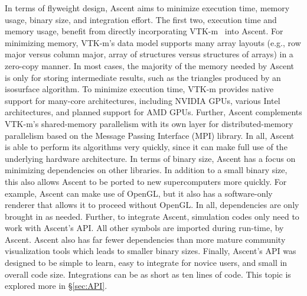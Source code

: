 In terms of flyweight design, Ascent aims to minimize
execution time, memory usage, binary size, and integration effort.
%
The first two, execution time and memory usage, benefit from directly
incorporating VTK-m~\cite{Moreland:CGA2016} into Ascent.
%
For minimizing memory,
VTK-m's data model supports many array layouts (e.g., row major versus
column major, array of structures versus structures of arrays)
in a zero-copy manner.
%
In most cases, the majority of the memory needed by Ascent is only for
storing intermediate results, such as the triangles produced by an isosurface algorithm.
%
To minimize execution time,
VTK-m provides native support for many-core architectures,
including NVIDIA GPUs, various Intel architectures,
and planned support for AMD GPUs.
%
Further, Ascent complements VTK-m's shared-memory parallelism with
its own layer for distributed-memory parallelism based on the
Message Passing Interface (MPI) library.
%
In all, Ascent is able to perform its algorithms very quickly,
since it can make full use of the underlying hardware architecture.
%
In terms of binary size, Ascent has a focus on minimizing dependencies on other libraries.
%
In addition to a small binary size, this also allows Ascent to be ported to new supercomputers
more quickly.
%
For example, Ascent can make use of OpenGL, but it also has a software-only renderer that allows
it to proceed without OpenGL.
%
In all, dependencies are only brought in as needed.
%
Further, to integrate Ascent, simulation codes only need to work with Ascent's API.
% 
All other symbols are imported during run-time, by Ascent.
Ascent also has far fewer dependencies than more mature community
visualization tools which leads to smaller binary sizes.
%
%
Finally, Ascent's API was designed to be simple to learn,
easy to integrate for novice users, and small in overall code size.
%
Integrations can be as short as ten lines of code.
%
This topic is explored more in \S\ref{sec:API}.

